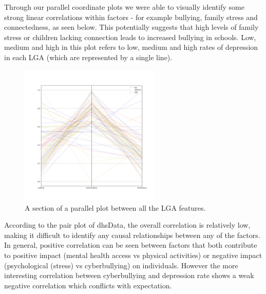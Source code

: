 \documentclass[a4, 11pt]{article}
\begin{document}
Through our parallel coordinate plots we were able to visually identify some strong linear correlations within factors - for example bullying, family stress and connectedness, as seen below. This potentially suggests that high levels of family stress or children lacking connection leads to increased bullying in schools. Low, medium and high in this plot refers to low, medium and high rates of depression in each LGA (which are represented by a single line).

\begin{figure}[h]
    \centering
    \includegraphics[width=0.6\textwidth]{./plots/parallel2.png}
    \caption{A section of a parallel plot between all the LGA features.}
    \label{fig:my_label}
\end{figure}


According to the pair plot of dhsData, the overall correlation is relatively low, making it difficult to identify any causal relationships between any of the factors. In general, positive correlation can be seen between factors that both contribute to positive impact (mental health access vs physical activities) or negative impact (psychological (stress) vs cyberbullying) on individuals. However the more interesting correlation between cyberbullying and depression rate shows a weak negative correlation which conflicts with expectation. 
\end{document}
